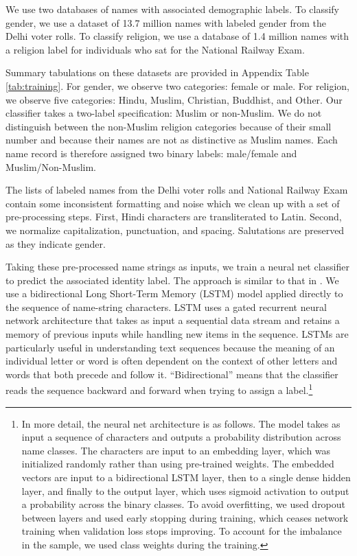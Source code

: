 \documentclass[12pt,english]{article}
\begin{document}
We use two databases of names with associated demographic labels. To classify gender, we use a dataset of 13.7 million names with labeled gender from the Delhi voter rolls.  To classify religion, we use a database of 1.4 million names with a religion label for individuals who sat for the National Railway Exam.
  
Summary tabulations on these datasets are provided in Appendix Table \ref{tab:training}. For gender, we observe two categories: female or male. For religion, we observe five categories: Hindu, Muslim, Christian, Buddhist, and Other. Our classifier takes a two-label specification: Muslim or non-Muslim. We do not distinguish between the non-Muslim religion categories because of their small number and because their names are not as distinctive as Muslim names. Each name record is therefore assigned two binary labels: male/female and Muslim/Non-Muslim.

The lists of labeled names from the Delhi voter rolls and National Railway Exam contain some inconsistent formatting and noise which we clean up with a set of pre-processing steps. First, Hindi characters are transliterated to Latin. Second, we normalize capitalization, punctuation, and spacing. Salutations are preserved as they indicate gender.

Taking these pre-processed name strings as inputs, we train a neural net classifier to predict the associated identity label. The approach is similar to that in \citet{chaturvedi2020neural}. We use a bidirectional Long Short-Term Memory (LSTM) model applied directly to the sequence of name-string characters. LSTM uses a gated recurrent neural network architecture that takes as input a sequential data stream and retains a memory of previous inputs while handling new items in the sequence. LSTMs are particularly useful in understanding text sequences because the meaning of an individual letter or word is often dependent on the context of other letters and words that both precede and follow it. ``Bidirectional'' means that the classifier reads the sequence backward and forward when trying to assign a label.\footnote{In more detail, the neural net architecture is as follows. The model takes as input a sequence of characters and outputs a probability distribution across name classes. The characters are input to an embedding layer, which was initialized randomly rather than using pre-trained weights. The embedded vectors are input to a bidirectional LSTM layer, then to a single dense hidden layer, and finally to the output layer, which uses sigmoid activation to output a probability across the binary classes. To avoid overfitting, we used dropout between layers and used early stopping during training, which ceases network training when validation loss stops improving.  To account for the imbalance in the sample, we used class weights during the training.} 
\end{document}
